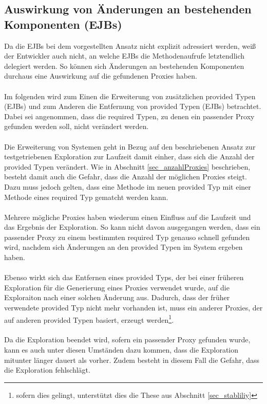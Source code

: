 \subsection{Auswirkung von Änderungen an bestehenden Komponenten (EJBs)}
Da die EJBs bei dem vorgestellten Ansatz nicht explizit adressiert werden, weiß der Entwickler auch nicht, an welche EJBs die Methodenaufrufe letztendlich delegiert werden. So können sich Änderungen an bestehenden Komponenten durchaus eine Auswirkung auf die gefundenen Proxies haben.
\\\\
Im folgenden wird zum Einen die Erweiterung von zusätzlichen provided Typen (EJBs) und zum Anderen die Entfernung von provided Typen (EJBs) betrachtet. Dabei sei angenommen, dass die required Typen, zu denen ein passender Proxy gefunden werden soll, nicht verändert werden.
\\\\
Die Erweiterung von Systemen geht in Bezug auf den beschriebenen Ansatz zur testgetriebenen Exploration zur Laufzeit damit einher, dass sich die Anzahl der provided Typen verändert. Wie in Abschnitt \ref{sec_anzahlProxies} beschrieben, besteht damit auch die Gefahr, dass die Anzahl der möglichen Proxies steigt. Dazu muss jedoch gelten, dass eine Methode im neuen provided Typ mit einer Methode eines required Typ gematcht werden kann.
\\\\
Mehrere mögliche Proxies haben wiederum einen Einfluss auf die Laufzeit und das Ergebnis der Exploration. So kann nicht davon ausgegangen werden, dass ein passender Proxy zu einem bestimmten required Typ genauso schnell gefunden wird, nachdem sich Änderungen an den provided Typen im System ergeben haben.
\\\\
Ebenso wirkt sich das Entfernen eines provided Typs, der bei einer früheren Exploration für die Generierung eines Proxies verwendet wurde, auf die Exploraiton nach einer solchen Änderung aus. Dadurch, dass der früher verwendete provided Typ nicht mehr vorhanden ist, muss ein anderer Proxies, der auf anderen provided Typen basiert, erzeugt werden\footnote{sofern dies gelingt, unterstützt dies die These aus Abschnitt \ref{sec_stabliliy}}.
\\\\
Da die Exploration beendet wird, sofern ein passender Proxy gefunden wurde, kann es auch unter diesen Umständen dazu kommen, dass die Exploration mitunter länger dauert als vorher. Zudem besteht in diesem Fall die Gefahr, dass die Exploration fehlschlägt.

